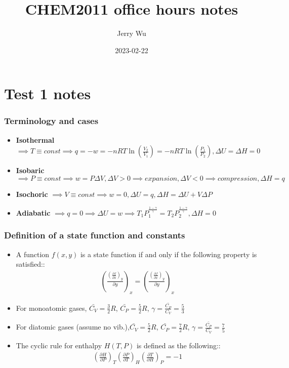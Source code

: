 \documentclass[12pt]{book}
\title{CHEM2011 office hours notes}
\author{Jerry Wu}
\date{2023-02-22}
\begin{document}
\maketitle
\chapter*{Test 1 notes}

\subsection*{Terminology and cases}

\begin{itemize}
    \item \textbf{Isothermal} $\implies T\equiv const\implies q=-w=-nRT\ln(\frac{V_2}{V_1})=-nRT\ln(\frac{P_1}{P_2}), \Delta U=\Delta H=0$
    \item \textbf{Isobaric} $\implies P\equiv const\implies w=P\Delta V, \Delta V>0\implies expansion, \Delta V<0\implies compression, \Delta H=q$
    \item \textbf{Isochoric} $\implies V\equiv const\implies w=0,\Delta U=q, \Delta H=\Delta U+V\Delta P$
    \item \textbf{Adiabatic} $\implies q=0\implies \Delta U=w\implies T_1P_1^{\frac{1-\gamma}{\gamma}}=T_2P_2^{\frac{1-\gamma}{\gamma}}, \Delta H=0$
\end{itemize}

\subsection*{Definition of a state function and constants}

\begin{itemize}
    \item A function $f(x,y)$ is a state function if and only if the following property is satisfied::
    \begin{align*}
        \left(\frac{\left(\frac{\partial f}{\partial x}\right)_y}{\partial y}\right)_x=\left(\frac{\left(\frac{\partial f}{\partial x}\right)_y}{\partial y}\right)_x
    \end{align*}
    \item For monoatomic gases, $\bar{C_V}=\frac{3}{2}R$, $\bar{C_P}=\frac{5}{2}R$, $\gamma=\frac{\bar{C_P}}{C_V}=\frac{5}{3}$
    \item For diatomic gases (assume no vib.),$\bar{C_V}=\frac{5}{2}R$, $\bar{C_P}=\frac{7}{2}R$, $\gamma=\frac{\bar{C_P}}{C_V}=\frac{7}{5}$
    \item The cyclic rule for enthalpy $H(T,P)$ is defined as the following::
    \begin{align*}
        \left(\frac{\partial H}{\partial P}\right)_T\left(\frac{\partial P}{\partial T}\right)_H\left(\frac{\partial T}{\partial H}\right)_P=-1
    \end{align*}
\end{itemize}
\end{document}
